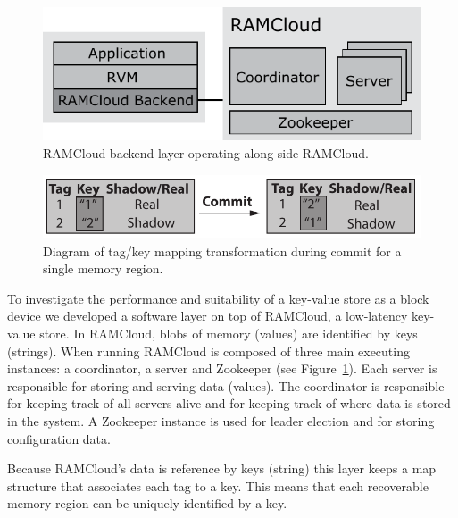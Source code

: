 
\begin{figure}[t!]
\begin{center}
\includegraphics[scale=0.60]{graphs/ramcloud_backend_design_final.pdf}
\end{center}
\caption{RAMCloud backend layer operating along side RAMCloud.}
\label{fig:ramcloud_backend_design}
\end{figure}

\begin{figure}[t!]
\begin{center}
\includegraphics[scale=0.60]{graphs/ramcloud_backend_commit.pdf}
\end{center}
\caption{Diagram of tag/key mapping transformation during commit for a single memory region.}
\label{fig:ramcloud_backend_commit}
\end{figure}

To investigate the performance and suitability of a key-value store as a block device we developed a software layer on top of RAMCloud, a low-latency key-value store.
In RAMCloud, blobs of memory (values) are identified by keys (strings). When running RAMCloud is composed of three main executing instances: a coordinator, a server and Zookeeper (see Figure~\ref{fig:ramcloud_backend_design}).
Each server is responsible for storing and serving data (values). The coordinator is responsible for keeping track of all servers alive and for keeping track of where data is stored in the system.
A Zookeeper instance is used for leader election and for storing configuration data.

Because RAMCloud's data is reference by keys (string) this layer keeps a map structure that associates each tag to a key. This means that each recoverable memory region can be uniquely identified by a key.

